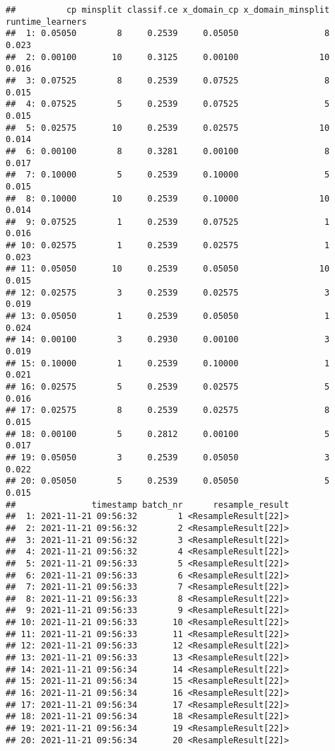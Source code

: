 \documentclass[
]{scrbook}
\begin{document}
\begin{verbatim}
##          cp minsplit classif.ce x_domain_cp x_domain_minsplit runtime_learners
##  1: 0.05050        8     0.2539     0.05050                 8            0.023
##  2: 0.00100       10     0.3125     0.00100                10            0.016
##  3: 0.07525        8     0.2539     0.07525                 8            0.015
##  4: 0.07525        5     0.2539     0.07525                 5            0.015
##  5: 0.02575       10     0.2539     0.02575                10            0.014
##  6: 0.00100        8     0.3281     0.00100                 8            0.017
##  7: 0.10000        5     0.2539     0.10000                 5            0.015
##  8: 0.10000       10     0.2539     0.10000                10            0.014
##  9: 0.07525        1     0.2539     0.07525                 1            0.016
## 10: 0.02575        1     0.2539     0.02575                 1            0.023
## 11: 0.05050       10     0.2539     0.05050                10            0.015
## 12: 0.02575        3     0.2539     0.02575                 3            0.019
## 13: 0.05050        1     0.2539     0.05050                 1            0.024
## 14: 0.00100        3     0.2930     0.00100                 3            0.019
## 15: 0.10000        1     0.2539     0.10000                 1            0.021
## 16: 0.02575        5     0.2539     0.02575                 5            0.016
## 17: 0.02575        8     0.2539     0.02575                 8            0.015
## 18: 0.00100        5     0.2812     0.00100                 5            0.017
## 19: 0.05050        3     0.2539     0.05050                 3            0.022
## 20: 0.05050        5     0.2539     0.05050                 5            0.015
##               timestamp batch_nr      resample_result
##  1: 2021-11-21 09:56:32        1 <ResampleResult[22]>
##  2: 2021-11-21 09:56:32        2 <ResampleResult[22]>
##  3: 2021-11-21 09:56:32        3 <ResampleResult[22]>
##  4: 2021-11-21 09:56:32        4 <ResampleResult[22]>
##  5: 2021-11-21 09:56:33        5 <ResampleResult[22]>
##  6: 2021-11-21 09:56:33        6 <ResampleResult[22]>
##  7: 2021-11-21 09:56:33        7 <ResampleResult[22]>
##  8: 2021-11-21 09:56:33        8 <ResampleResult[22]>
##  9: 2021-11-21 09:56:33        9 <ResampleResult[22]>
## 10: 2021-11-21 09:56:33       10 <ResampleResult[22]>
## 11: 2021-11-21 09:56:33       11 <ResampleResult[22]>
## 12: 2021-11-21 09:56:33       12 <ResampleResult[22]>
## 13: 2021-11-21 09:56:33       13 <ResampleResult[22]>
## 14: 2021-11-21 09:56:34       14 <ResampleResult[22]>
## 15: 2021-11-21 09:56:34       15 <ResampleResult[22]>
## 16: 2021-11-21 09:56:34       16 <ResampleResult[22]>
## 17: 2021-11-21 09:56:34       17 <ResampleResult[22]>
## 18: 2021-11-21 09:56:34       18 <ResampleResult[22]>
## 19: 2021-11-21 09:56:34       19 <ResampleResult[22]>
## 20: 2021-11-21 09:56:34       20 <ResampleResult[22]>
\end{verbatim}
\end{document}
